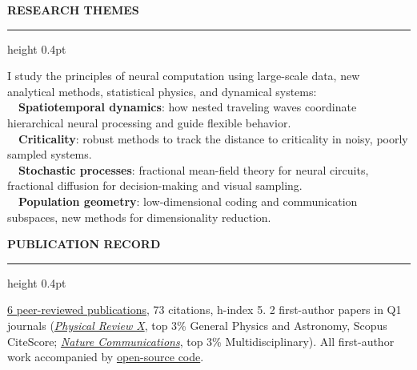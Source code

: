 \documentclass[10pt,a4paper]{article}
\renewcommand{\section}[1]{%
  \par\vspace{8pt}%
  {\small\bfseries\MakeUppercase{#1}}\par
  \vspace{4pt}\hrule height 0.4pt\vspace{2pt}}
\begin{document}
\section{Research themes}
\noindent\begin{minipage}[t]{\textwidth}\small
I study the principles of neural computation using large-scale data, new analytical methods, statistical physics, and dynamical systems:\\[3pt]
\hspace*{1.5em}\textbullet\ \ \textbf{Spatiotemporal dynamics}: how nested traveling waves coordinate hierarchical neural processing and guide flexible behavior.\\[1pt]
\hspace*{1.5em}\textbullet\ \ \textbf{Criticality}: robust methods to track the distance to criticality in noisy, poorly sampled systems.\\[1pt]
\hspace*{1.5em}\textbullet\ \ \textbf{Stochastic processes}: fractional mean-field theory for neural circuits, fractional diffusion for decision-making and visual sampling.\\[1pt]
\hspace*{1.5em}\textbullet\ \ \textbf{Population geometry}: low-dimensional coding and communication subspaces, new methods for dimensionality reduction.
\end{minipage}\par\vspace{2pt}

\vspace{2pt}

\section{Publication record}
\noindent\begin{minipage}[t]{\textwidth}\small
\href{https://scholar.google.com/citations?user=XYfQ92sAAAAJ}{6 peer-reviewed publications}, 73 citations, h-index 5. 2 first-author papers in Q1 journals (\href{https://doi.org/10.1103/PhysRevX.14.031021}{\emph{Physical Review X}}, top 3\% General Physics and Astronomy, Scopus CiteScore; \href{https://doi.org/10.1038/s41467-026-68893-4}{\emph{Nature Communications}}, top 3\% Multidisciplinary). All first-author work accompanied by \href{https://github.com/brendanjohnharris}{open-source code}.
\end{minipage}\par\vspace{2pt}
\end{document}
